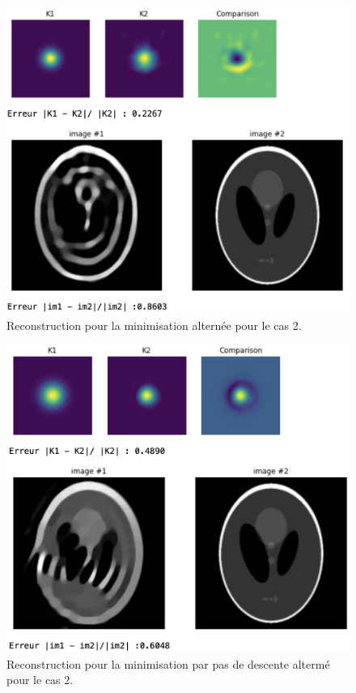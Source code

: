 \documentclass[a4paper]{article}
\begin{document}
%
\begin{figure}[h]
\includegraphics[scale=0.6]{figures/altrn-cas2}	
\caption{Reconstruction pour la minimisation alternée pour le cas 2.}
\end{figure}
%
\begin{figure}[h]
\includegraphics[scale=0.6]{figures/pda-cas2}	
\caption{Reconstruction pour la minimisation par pas de descente altermé pour le cas 2.}
\end{figure}
\end{document}

